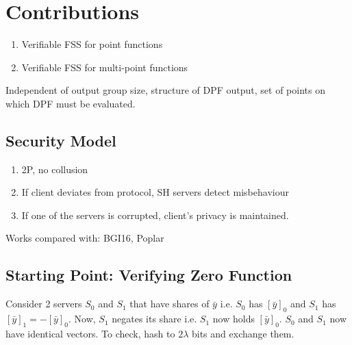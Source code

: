 
\clearpage
{}

%
\setcounter{section}{0} %

\section{Contributions}
\begin{enumerate}
    \item Verifiable FSS for point functions
    \item Verifiable FSS for multi-point functions
\end{enumerate}

Independent of output group size, structure of DPF output, set of points on which DPF must be evaluated. \\

\subsection{Security Model}
\begin{enumerate}
    \item 2P, no collusion
    \item If client deviates from protocol, SH servers detect misbehaviour
    \item If one of the servers is corrupted, client's privacy is maintained. 
\end{enumerate}

Works compared with: BGI16, Poplar \\

\subsection{Starting Point: Verifying Zero Function}
Consider 2 servers $S_0$ and $S_1$ that have shares of $\bar{y}$ i.e. $S_0$ has $[\bar{y}]_0$ and $S_1$ has $[\bar{y}]_1 = -[\bar{y}]_0$. Now, $S_1$ negates its share i.e. $S_1$ now holds $[\bar{y}]_0$. $S_0$ and $S_1$ now have identical vectors. To check, hash to $2\lambda$ bits and exchange them.

